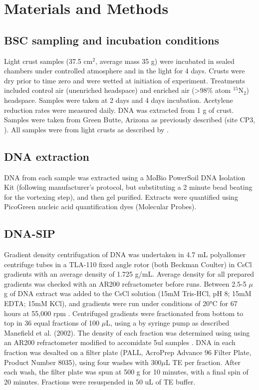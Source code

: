 \section{Materials and Methods}
\subsection{BSC sampling and incubation conditions}
Light crust samples (37.5 cm$^{2}$, average mass 35 g) were incubated in sealed
chambers under controlled atmosphere and in the light for 4 days. Crusts were
dry prior to time zero and were wetted at initiation of experiment. Treatments
included control air (unenriched headspace) and enriched air (\textgreater98\%
atom $^{15}$N$_{2}$) headspace. Samples were taken at 2 days and 4 days
incubation.  Acetylene reduction rates were measured daily. DNA was extracted
from 1 g of crust.  Samples were taken from Green Butte, Arizona as previously
described (site CP3, \citet{BERALDI_CAMPESI_2009}). All samples were from light
crusts as described by \cite{15643930}.
\subsection{DNA extraction}
DNA from each sample was extracted using a MoBio PowerSoil DNA Isolation Kit (following manufacturer’s protocol, but substituting a 2 minute bead beating for the vortexing step), and then gel purified. Extracts were quantified using PicoGreen nucleic acid quantification dyes (Molecular Probes). 
\subsection{DNA-SIP}
 Gradient density centrifugation of DNA was undertaken in 4.7 mL polyallomer
 centrifuge tubes in a TLA-110 fixed angle rotor (both Beckman Coulter) in CsCl
 gradients with an average density of 1.725 g/mL.  Average density for all
 prepared gradients was checked with an AR200 refractometer before runs.
 Between 2.5-5 $\mu$g of DNA extract was added to the CsCl solution 
 (15mM Tris-HCl, pH 8; 15mM EDTA; 15mM KCl), and
 gradients were run under conditions of 20°C for 67 hours at 55,000 rpm 
 \citep{17369332}. Centrifuged gradients were fractionated from bottom to
 top in 36 equal fractions of 100 $\mu$L, using a by syringe pump as described
 Manefield et al. (2002). The density of each fraction was determined using
 using an AR200 refractometer modified to accomidate 5ul
 samples \citep{17369332}. DNA in each fraction was desalted on a filter plate
 (PALL, AcroPrep Advance 96 Filter Plate, Product Number 8035), using four
 washes with 300$\mu$L TE per fraction. After each wash, the filter plate was spun
 at 500 g for 10 minutes, with a final spin of 20 minutes. Fractions were
 resuspended in 50 uL of TE buffer.

